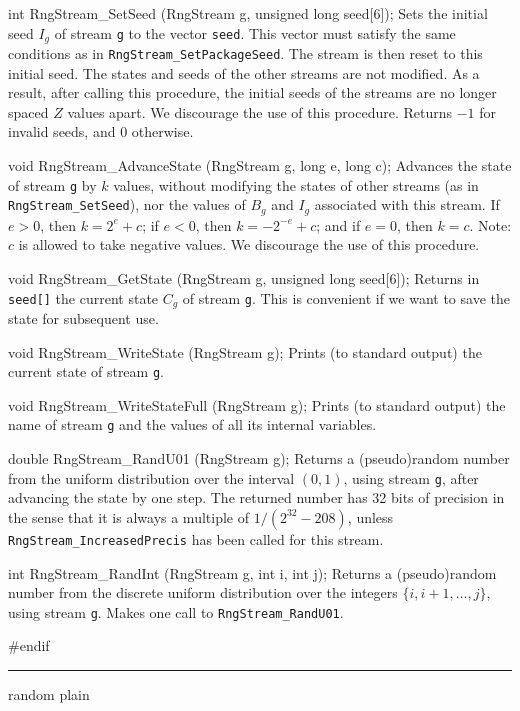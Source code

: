\documentclass[12pt]{article}
\begin{document}
int RngStream_SetSeed (RngStream g, unsigned long seed[6]);
\endcode
 \tab  Sets the initial seed $I_g$ of stream {\tt g}
  to the vector {\tt seed}.  This vector must satisfy the same 
  conditions as in {\tt RngStream\_SetPackageSeed}.
  The stream is then reset to this initial seed.
  The states and seeds of the other streams are not modified.
  As a result, after calling this procedure, the initial seeds
  of the streams are no longer spaced $Z$ values apart.
  We discourage the use of this procedure.  
   Returns $-1$ for invalid seeds, and 0 otherwise.
 \endtab
\code

void RngStream_AdvanceState (RngStream g, long e, long c);
\endcode
 \tab Advances the state of stream {\tt g} by $k$ values,
  without modifying the states of other streams
  (as in {\tt RngStream\_SetSeed}),
  nor the values of $B_g$ and $I_g$ associated with this stream.
  If $e > 0$, then $k=2^e + c$; 
  if $e < 0$,  then $k=-2^{-e} + c$; and if $e = 0$,  then $k=c$.
  Note: $c$ is allowed to take negative values.
  We discourage the use of this procedure.
 \endtab
\code

void RngStream_GetState (RngStream g, unsigned long seed[6]);
\endcode
 \tab Returns in {\tt seed[]} the current state $C_g$ of stream {\tt g}.
  This is convenient if we want to save the state for subsequent use.  
 \endtab
\code

void RngStream_WriteState (RngStream g);
\endcode
 \tab Prints (to standard output) the current state of stream {\tt g}.
 \endtab
\code

void RngStream_WriteStateFull (RngStream g);
\endcode
 \tab Prints (to standard output) the name of stream {\tt g} and the values
  of all its internal variables.
 \endtab
\code

double RngStream_RandU01 (RngStream g);
\endcode
 \tab Returns a (pseudo)random number from the uniform distribution
   over the interval $(0,1)$, using stream {\tt g}, 
   after advancing the state by one step.  
   The returned number has 32 bits of precision in the sense that it is
   always a multiple of $1/(2^{32}-208)$,
   unless {\tt RngStream\_IncreasedPrecis} has been called for this stream.
 \endtab
\code

int RngStream_RandInt (RngStream g, int i, int j);
\endcode
 \tab Returns a (pseudo)random number from the discrete uniform 
   distribution over the integers $\{i,i+1,\dots,j\}$,
   using stream {\tt g}.  
   Makes one call to {\tt RngStream\_RandU01}.
 \endtab
\code\hide

#endif
\endhide
\endcode

\bigskip
\hrule
 {random}
 {plain}
\end{document}
